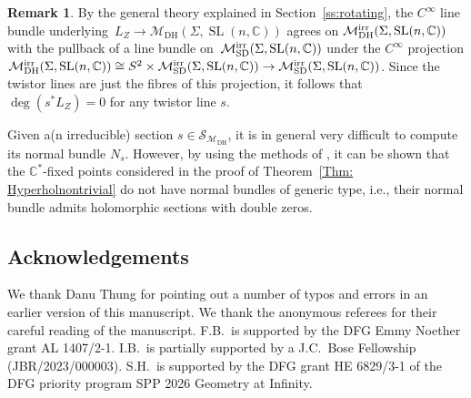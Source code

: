 \documentclass[pdftex]{sigma}
\numberwithin{equation}{section}
\theoremstyle{definition}
\newtheorem{Remark}[Theorem]{Remark}
\newcommand\C{{\mathbb C}}
\begin{document}
\begin{Remark}
By the general theory explained in Section~\ref{ss:rotating}, the $C^\infty$ line bundle underlying~${L_Z \longrightarrow \mathcal{M}_{\mathrm{DH}}(\Sigma,\operatorname{SL}(n,\C))}$ agrees on $\mathcal{M}_{\mathrm{DH}}^{\rm irr}(\Sigma,\operatorname{SL}(n,\C))$ with the pullback of a line bundle on~$\mathcal{M}_{\mathrm{SD}}^{\rm irr}(\Sigma,\operatorname{SL}(n,\C))$ under the $C^\infty$ projection $\mathcal{M}_{\mathrm{DH}}^{\rm irr}(\Sigma,\operatorname{SL}(n,\C))\cong S^2\times \mathcal{M}_{\mathrm{SD}}^{\rm irr}(\Sigma,\operatorname{SL}(n,\C))\to \mathcal{M}_{\mathrm{SD}}^{\rm irr}(\Sigma,\operatorname{SL}(n,\C))$. Since the twistor lines are just the fibres of this projection, it follows that~$\deg(s^*L_Z) =0$ for any twistor line $s$.
\end{Remark}

Given a(n irreducible) section $s\in \mathcal{S}_{\mathcal{M}_{\mathrm{DH}}}$, it is in general very difficult to compute its normal bundle $N_s$.
However,
by using the methods of \cite{Hel}, it can be shown that the $\C^*$-fixed points considered in the proof of
Theorem~\ref{Thm: Hyperholnontrivial} do not have
normal bundles of generic type, i.e., their normal bundle admits holomorphic sections with double zeros.

\subsection*{Acknowledgements}
 We thank Danu Thung for pointing out a number of typos and errors in an earlier version of this manuscript. We thank the anonymous referees for their careful reading of the manuscript.
F.B.\ is supported by the DFG Emmy Noether grant AL 1407/2-1. I.B.\ is partially supported by a J.C.~Bose
Fellowship (JBR/2023/000003). S.H.\ is supported by the DFG grant HE 6829/3-1 of the DFG priority program SPP 2026 Geometry at
Infinity.
\end{document}
